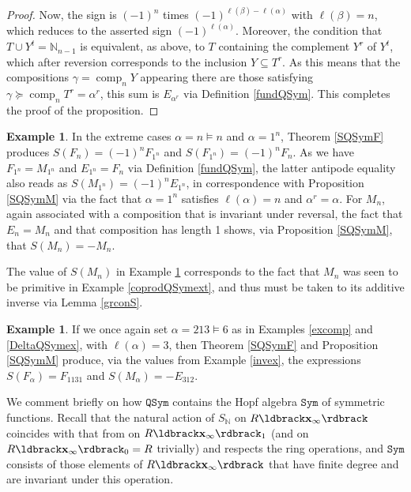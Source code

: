 \documentclass{article}
\theoremstyle{definition}
\newtheorem{ex}[thm]{Example}
\begin{document}
\begin{proof}
Now, the sign is $(-1)^{n}$ times $(-1)^{\ell(\beta)-\ell(\alpha)}$ with $\ell(\beta)=n$, which reduces to the asserted sign $(-1)^{\ell(\alpha)}$. Moreover, the condition that $T \cup Y^{t}=\mathbb{N}_{n-1}$ is equivalent, as above, to $T$ containing the complement $Y^{r}$ of $Y^{t}$, which after reversion corresponds to the inclusion $Y \subseteq T^{r}$. As this means that the compositions $\gamma=\operatorname{comp}_{n}Y$ appearing there are those satisfying $\gamma\succeq\operatorname{comp}_{n}T^{r}=\alpha^{r}$, this sum is $E_{\alpha^{r}}$ via Definition \ref{fundQSym}. This completes the proof of the proposition.
\end{proof}

\begin{ex}
In the extreme cases $\alpha=n \vDash n$ and $\alpha=1^{n}$, Theorem \ref{SQSymF} produces $S(F_{n})=(-1)^{n}F_{1^{n}}$ and $S(F_{1^{n}})=(-1)^{n}F_{n}$. As we have $F_{1^{n}}=M_{1^{n}}$ and $E_{1^{n}}=F_{n}$ via Definition \ref{fundQSym}, the latter antipode equality also reads as $S(M_{1^{n}})=(-1)^{n}E_{1^{n}}$, in correspondence with Proposition \ref{SQSymM} via the fact that $\alpha=1^{n}$ satisfies $\ell(\alpha)=n$ and $\alpha^{r}=\alpha$. For $M_{n}$, again associated with a composition that is invariant under reversal, the fact that $E_{n}=M_{n}$ and that composition has length 1 shows, via Proposition \ref{SQSymM}, that $S(M_{n})=-M_{n}$. \label{antQSymext}
\end{ex}
The value of $S(M_{n})$ in Example \ref{antQSymext} corresponds to the fact that $M_{n}$ was seen to be primitive in Example \ref{coprodQSymext}, and thus must be taken to its additive inverse via Lemma \ref{grconS}.
\begin{ex}
If we once again set $\alpha=213\vDash6$ as in Examples \ref{excomp} and \ref{DeltaQSymex}, with $\ell(\alpha)=3$, then Theorem \ref{SQSymF} and Proposition \ref{SQSymM} produce, via the values from Example \ref{invex}, the expressions $S(F_{\alpha})=F_{1131}$ and $S(M_{\alpha})=-E_{312}$. \label{SQSymex}
\end{ex}

\medskip

We comment briefly on how $\mathtt{QSym}$ contains the Hopf algebra $\mathtt{Sym}$ of symmetric functions. Recall that the natural action of $S_{\mathbb{N}}$ on $R\ldbrack\mathbf{x}_{\infty}\rdbrack$ coincides with that from \cite{[Hi2]} on $R\ldbrack\mathbf{x}_{\infty}\rdbrack_{1}$ (and on $R\ldbrack\mathbf{x}_{\infty}\rdbrack_{0}=R$ trivially) and respects the ring operations, and $\mathtt{Sym}$ consists of those elements of $R\ldbrack\mathbf{x}_{\infty}\rdbrack$ that have finite degree and are invariant under this operation.
\end{document}
